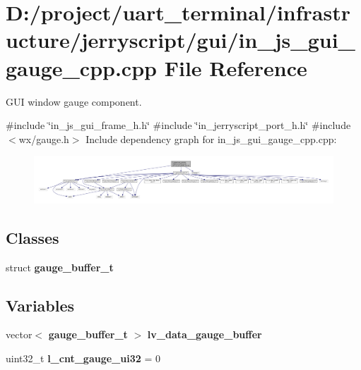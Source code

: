 \section{D\+:/project/uart\+\_\+terminal/infrastructure/jerryscript/gui/in\+\_\+js\+\_\+gui\+\_\+gauge\+\_\+cpp.cpp File Reference}
\label{in__js__gui__gauge__cpp_8cpp}


G\+UI window gauge component.  


{\ttfamily \#include \char`\"{}in\+\_\+js\+\_\+gui\+\_\+frame\+\_\+h.\+h\char`\"{}}\newline
{\ttfamily \#include \char`\"{}in\+\_\+jerryscript\+\_\+port\+\_\+h.\+h\char`\"{}}\newline
{\ttfamily \#include $<$wx/gauge.\+h$>$}\newline
Include dependency graph for in\+\_\+js\+\_\+gui\+\_\+gauge\+\_\+cpp.\+cpp\+:
\nopagebreak
\begin{figure}[H]
\begin{center}
\leavevmode
\includegraphics[width=350pt]{in__js__gui__gauge__cpp_8cpp__incl}
\end{center}
\end{figure}
\subsection*{Classes}
\begin{DoxyCompactItemize}
\item 
struct \textbf{ gauge\+\_\+buffer\+\_\+t}
\end{DoxyCompactItemize}
\subsection*{Variables}
\begin{DoxyCompactItemize}
\item 
vector$<$ \textbf{ gauge\+\_\+buffer\+\_\+t} $>$ \textbf{ lv\+\_\+data\+\_\+gauge\+\_\+buffer}
\item 
uint32\+\_\+t {\bfseries l\+\_\+cnt\+\_\+gauge\+\_\+ui32} = 0
\end{DoxyCompactItemize}


